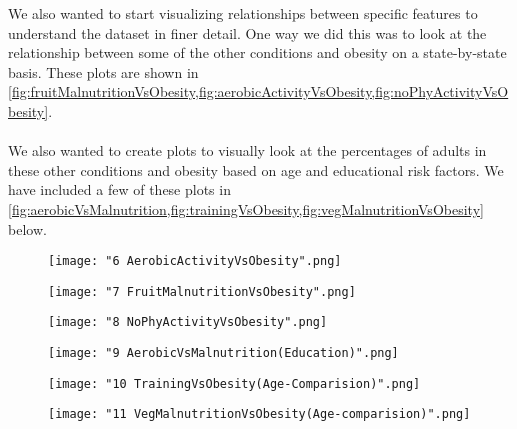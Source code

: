 \documentclass{article}
\begin{document}
We also wanted to start visualizing relationships between specific features to understand the dataset in finer detail. One way we did this was to look at the relationship between some of the other conditions and obesity on a state-by-state basis. These plots are shown in \cref{fig:fruitMalnutritionVsObesity,fig:aerobicActivityVsObesity,fig:noPhyActivityVsObesity}. 
\\\\
We also wanted to create plots to visually look at the percentages of adults in these other conditions and obesity based on age and educational risk factors. We have included a few of these plots in \cref{fig:aerobicVsMalnutrition,fig:trainingVsObesity,fig:vegMalnutritionVsObesity} below.
\begin{figure}[h]
\centering
\caption{}
\texttt{[image: "6 AerobicActivityVsObesity".png]}
\label{fig:aerobicActivityVsObesity}
\end{figure}
\begin{figure}[h]
\centering
\caption{}
\texttt{[image: "7 FruitMalnutritionVsObesity".png]}
\label{fig:fruitMalnutritionVsObesity}
\end{figure}
\begin{figure}[h]
\centering
\caption{}
\texttt{[image: "8 NoPhyActivityVsObesity".png]}
\label{fig:noPhyActivityVsObesity}
\end{figure}
\begin{figure}[h]
\centering
\caption{}
\texttt{[image: "9 AerobicVsMalnutrition(Education)".png]}
\label{fig:aerobicVsMalnutrition}
\end{figure}
\begin{figure}[h]
\centering
\caption{}
\texttt{[image: "10 TrainingVsObesity(Age-Comparision)".png]}
\label{fig:trainingVsObesity}
\end{figure}
\begin{figure}[h]
\centering
\caption{}
\texttt{[image: "11 VegMalnutritionVsObesity(Age-comparision)".png]}
\label{fig:vegMalnutritionVsObesity}
\end{figure}
\end{document}
